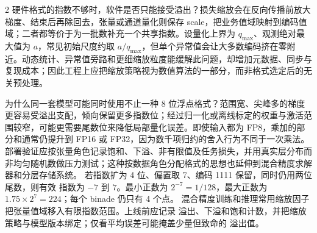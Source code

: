 \begin{solutionexercise}{2}
硬件格式的指数不够时，软件是否只能接受溢出？损失缩放会在反向传播前放大梯度、结束后再除回去，张量或通道量化则保存 scale，把业务值域映射到编码值域；二者都等价于为一批数补充一个共享指数。设量化上界为 $q_{\max}$、观测绝对最大值为 $a$，常见初始尺度约取 $a/q_{\max}$，但单个异常值会让大多数编码挤在零附近。动态统计、异常值旁路和更细缩放粒度能缓解此问题，却增加元数据、同步与复现成本；因此工程上应把缩放策略视为数值算法的一部分，而非格式选定后的无关预处理。

为什么同一套模型可能同时使用不止一种 8 位浮点格式？范围宽、尖峰多的梯度更容易受溢出支配，倾向保留更多指数位；经过归一化或离线标定的权重与激活范围较窄，可能更需要尾数位来降低局部量化误差。即使输入都为 FP8，乘加的部分和通常仍提升到 FP16 或 FP32，因为数千项归约的舍入行为不同于一次乘法。部署验证应按张量角色记录饱和、下溢、非有限值及任务损失，并用真实层分布而非均匀随机数做压力测试；这种按数据角色分配格式的思想也延伸到混合精度求解器和分层存储系统。
\variantheading 若指数扩为 4 位、偏置取 7、编码 1111 保留，同时仍用两位尾数，则有效
指数为 $-7$ 到 $7$。最小正数为 $2^{-7}=1/128$，最大正数为
$1.75\times2^7=224$；每个 binade 仍只有 4 个点。
\practiceheading 混合精度训练和推理常用缩放因子把张量值域移入有限指数范围。上线前应记录
溢出、下溢和饱和计数，并把缩放策略与模型版本绑定；仅看平均误差可能掩盖少量但致命的
溢出值。
\end{solutionexercise}

